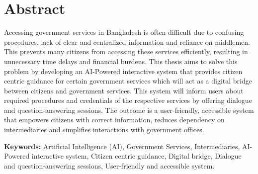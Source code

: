 \section*{Abstract}

Accessing government services in Bangladesh is often difficult due to confusing procedures, lack of clear and centralized information and reliance on middlemen. This prevents many citizens from accessing these services efficiently, resulting in unnecessary time delays and financial burdens. This thesis aims to solve this problem by developing an AI-Powered interactive system that provides citizen centric guidance for certain government services which will act as a digital bridge between citizens and government services. This system will inform users about required procedures and credentials of the respective services by offering dialogue and question-answering sessions. The outcome is a user-friendly, accessible system that empowers citizens with correct information, reduces dependency on intermediaries and simplifies interactions with government offices.

\vspace{1cm}
\textbf{Keywords:} Artificial Intelligence (AI), Government Services, Intermediaries, AI-Powered interactive system, Citizen centric guidance, Digital bridge, Dialogue and question-answering sessions, User-friendly and accessible system.
\pagebreak